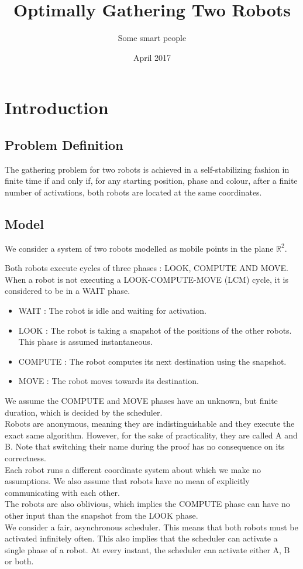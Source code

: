 \documentclass[11pt]{article}
\title{Optimally Gathering Two Robots}
\author{Some smart people}
\date{April 2017}
\begin{document}
\maketitle

\section{Introduction}

\subsection{Problem Definition}


The gathering problem for two robots is achieved in a self-stabilizing fashion in finite time if and only if, for any starting position, phase and colour, after a finite number of activations, both robots are located at the same coordinates.



\subsection{Model}

We consider a system of two robots modelled as mobile points in the plane $\mathbb{R}^2$.

Both robots execute cycles of three phases : LOOK, COMPUTE AND MOVE. When a robot is not executing a LOOK-COMPUTE-MOVE (LCM) cycle, it is considered to be in a WAIT phase.

\begin{itemize}
\item WAIT : The robot is idle and waiting for activation.
\item LOOK : The robot is taking a snapshot of the positions of the other robots. This phase is assumed instantaneous.
\item COMPUTE : The robot computes its next destination using the snapshot. 
\item MOVE : The robot moves towards its destination.

\end{itemize}

We assume the COMPUTE and MOVE phases have an unknown, but finite duration, which is decided by the scheduler.
\\
Robots are anonymous, meaning they are indistinguishable and they execute the exact same algorithm. However, for the sake of practicality, they are called A and B. Note that switching their name during the proof has no consequence on its correctness.
\\
Each robot runs a different coordinate system about which we make no assumptions. We also assume that robots have no mean of explicitly communicating with each other.
\\
The robots are also oblivious, which implies the COMPUTE phase can have no other input than the snapshot from the LOOK phase.
\\
We consider a fair, asynchronous scheduler. This means that both robots must be activated infinitely often. This also implies that the scheduler can activate a single phase of a robot.
At every instant, the scheduler can activate either A, B or both.
\end{document}
